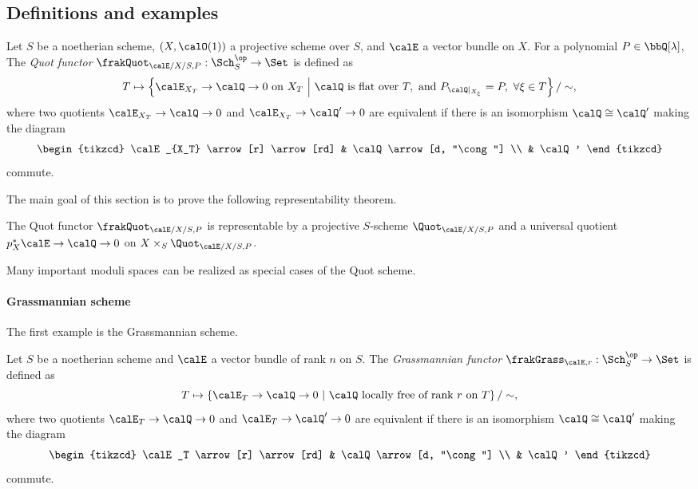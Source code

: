 \subsection{Definitions and examples}

    \begin{definition}\label{def:Quot_functor}
        Let \(S\) be a noetherian scheme, \((X,\calO(1))\) a projective scheme over \(S\), and \(\calE\) a vector bundle on \(X\).
        For a polynomial \(P \in \bbQ[\lambda]\),
        The \emph{Quot functor} \(\frakQuot_{\calE/X/S,P}:\Sch_S^\op \to \Set\) is defined as
        \[ T \mapsto \left\{ \calE_{X_T} \to \calQ \to 0 \text{ on } X_T \ \middle|\ \calQ \text{ is flat over } T,\text{ and } P_{\calQ|_{X_\xi}} = P,\ \forall \xi \in T \right\} / \sim, \]
        where two quotients \(\calE_{X_T} \to \calQ \to 0\) and \(\calE_{X_T} \to \calQ' \to 0\) are equivalent if there is an isomorphism \(\calQ \cong \calQ'\) making the diagram
        \[ \begin{tikzcd}
            \calE_{X_T} \arrow[r] \arrow[rd] & \calQ \arrow[d, "\cong"] \\
            & \calQ'
        \end{tikzcd} \]
        commute.
    \end{definition}

    The main goal of this section is to prove the following representability theorem.

    \begin{theorem}\label{thm:Quot_is_representable}
        The Quot functor \(\frakQuot_{\calE/X/S,P}\) is representable by a projective \(S\)-scheme \(\Quot_{\calE/X/S,P}\) and a universal quotient \(p_X^*\calE \to \calQ \to 0\) on \(X \times_S \Quot_{\calE/X/S,P}\).
    \end{theorem}

    Many important moduli spaces can be realized as special cases of the Quot scheme.
    
    \paragraph{Grassmannian scheme} The first example is the Grassmannian scheme.

    \begin{definition}\label{def:Grassmannian_functor}
        Let \(S\) be a noetherian scheme and \(\calE\) a vector bundle of rank \(n\) on \(S\).
        The \emph{Grassmannian functor} \(\frakGrass_{\calE,r}:\Sch_S^\op \to \Set\) is defined as 
        \[ T \mapsto \left\{\calE_T \to \calQ \to 0 \ \middle|\ \calQ \text{ locally free of rank } r \text{ on } T \right\} / \sim, \]
        where two quotients \(\calE_T \to \calQ \to 0\) and \(\calE_T \to \calQ' \to 0\) are equivalent if there is an isomorphism \(\calQ \cong \calQ'\) making the diagram
        \[ \begin{tikzcd}
            \calE_T \arrow[r] \arrow[rd] & \calQ \arrow[d, "\cong"] \\
            & \calQ'
        \end{tikzcd} \]
        commute.
    \end{definition}

